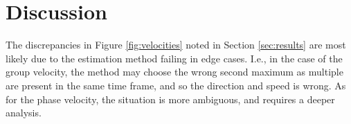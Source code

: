\section{Discussion}
\label{sec:conclusion}

The discrepancies in Figure \ref{fig:velocities} noted in Section \ref{sec:results} are most likely due to the estimation method failing in edge cases. I.e., in the case of the group velocity, the method may choose the wrong second maximum as multiple are present in the same time frame, and so the direction and speed is wrong. As for the phase velocity, the situation is more ambiguous, and requires a deeper analysis.